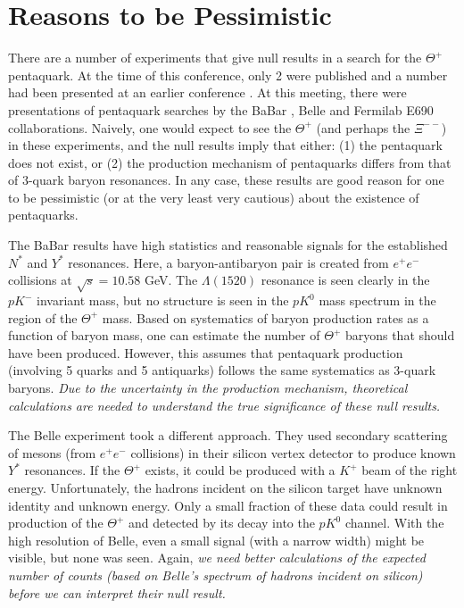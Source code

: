 \documentclass{ws-procs9x6}
\newcommand{\thp}{$\Theta^+$ }
\begin{document}
\section{ Reasons to be Pessimistic }

There are a number of experiments that give null results in a 
search for the \thp pentaquark.  At the time of this conference, 
only 2 were published \cite{bes,hera-b} and a number had been 
presented at an earlier conference \cite{indiana}.  At this 
meeting, there were presentations of pentaquark searches by the 
BaBar \cite{babar}, Belle \cite{belle} and Fermilab E690 \cite{e690} 
collaborations.  Naively, one would expect to see the \thp (and 
perhaps the $\Xi^{--}$) in these experiments, and the null results 
imply that either: (1) the pentaquark does not exist, or (2) the 
production mechanism of pentaquarks differs from that of 3-quark 
baryon resonances.  In any case, these results are good reason 
for one to be pessimistic (or at the very least very cautious) 
about the existence of pentaquarks.

The BaBar results \cite{babar} have high statistics and reasonable 
signals for the established $N^*$ and $Y^*$ resonances.  Here, a 
baryon-antibaryon pair is created from $e^+e^-$ collisions at 
$\sqrt{s}=10.58$ GeV. The $\Lambda (1520)$ resonance is seen clearly 
in the $pK^-$ invariant mass, but no structure is seen in the $pK^0$ 
mass spectrum in the region of the \thp mass.  Based on systematics 
of baryon production rates as a function of baryon mass, one can 
estimate the number of \thp baryons that should have been produced. 
However, this assumes that pentaquark production (involving 5 quarks 
and 5 antiquarks) follows the same systematics as 3-quark baryons. 
{\it Due to the uncertainty in the production mechanism, theoretical 
calculations are needed to understand the true significance of these 
null results.}

The Belle experiment \cite{belle} took a different approach.  They 
used secondary scattering of mesons (from $e^+e^-$ collisions) in 
their silicon vertex detector to produce known $Y^*$ resonances. 
If the \thp exists, it could be produced with a $K^+$ beam of the 
right energy.  Unfortunately, the hadrons incident on the silicon 
target have unknown identity and unknown energy.  Only a small 
fraction of these data could result in production of the \thp and 
detected by its decay into the $pK^0$ channel.  With the high 
resolution of Belle, even a small signal (with a narrow width) 
might be visible, but none was seen. Again, {\it we need better 
calculations of the expected number of counts (based 
on Belle's spectrum of hadrons incident on silicon)  before we 
can interpret their null result.}
\end{document}
